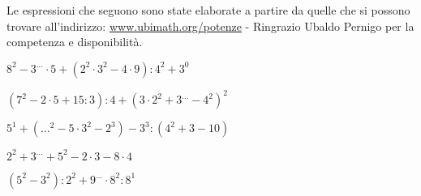 
Le espressioni che seguono sono state elaborate a partire da quelle che si 
possono trovare all'indirizzo:
\href{http://www.ubimath.org/potenze}{www.ubimath.org/potenze} - 
Ringrazio Ubaldo Pernigo per la competenza e disponibilità.

\begin{esercizio} %
\(8^2-3^{\dots}\cdot5+(2^2\cdot3^2-4\cdot9):4^2+3^0\) 
\end{esercizio}
\begin{esercizio} %
\((7^2-2\cdot5+15:3):4+(3\cdot2^2+3^{\dots}-4^2)^2\) 
\end{esercizio}
\begin{esercizio} %
\(5^1+({\dots}^2-5\cdot3^2-2^3)-3^3:(4^2+3-10)\) 
\end{esercizio}
\begin{esercizio} %
\(2^2+3^{\dots}+5^2-2\cdot3-8\cdot4\) 
\end{esercizio}
\begin{esercizio} %
\((5^2-3^2):2^2+9^{\dots}\cdot8^2:8^1\) 
\end{esercizio}
